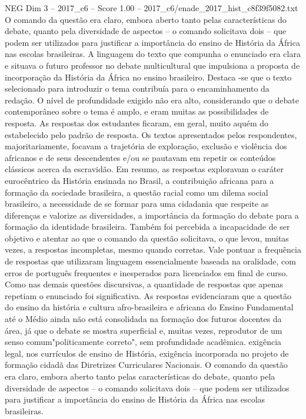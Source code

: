 \begin{textsample}{NEG Dim 3 – 2017\_c6 – Score 1.00 – 2017\_c6/enade\_2017\_hist\_c8f39f5082.txt}
O comando da questão era claro, embora aberto tanto pelas características do debate, quanto pela diversidade de aspectos – o comando solicitava dois – que podem ser utilizados para justificar a importância do ensino de História da África nas escolas brasileiras.
A linguagem do texto que compunha o enunciado era clara e situava o futuro professor no debate multicultural que impulsiona a proposta de incorporação da História da África no ensino brasileiro.
Destaca -se que o texto selecionado para introduzir o tema contribuía para o encaminhamento da redação.
O nível de profundidade exigido não era alto, considerando que o debate contemporâneo sobre o tema é amplo, e eram muitas as possibilidades de resposta.
As respostas dos estudantes ficaram, em geral, muito aquém do estabelecido pelo padrão de resposta.
Os textos apresentados pelos respondentes, majoritariamente, focavam a trajetória de exploração, exclusão e violência dos africanos e de seus descendentes e/ou se pautavam em repetir os conteúdos clássicos acerca da escravidão.
Em resumo, as respostas exploravam o caráter eurocêntrico da História ensinada no Brasil, a contribuição africana para a formação da sociedade brasileira, a questão racial como um dilema social brasileiro, a necessidade de se formar para uma cidadania que respeite as diferenças e valorize as diversidades, a importância da formação do debate para a formação da identidade brasileira.
Também foi percebida a incapacidade de ser objetivo e atentar ao que o comando da questão solicitava, o que levou, muitas vezes, a respostas incompletas, mesmo quando corretas.
Vale pontuar a frequência de respostas que utilizaram linguagem essencialmente baseada na oralidade, com erros de português frequentes e inesperados para licenciados em final de curso.
Como nas demais questões discursivas, a quantidade de respostas que apenas repetiam o enunciado foi significativa.
As respostas evidenciaram que a questão do ensino da história e cultura afro-brasileira e africana do Ensino Fundamental até o Médio ainda não está consolidada na formação dos futuros docentes da área, já que o debate se mostra superficial e, muitas vezes, reprodutor de um senso comum"politicamente correto", sem profundidade acadêmica. exigência legal, nos currículos de ensino de História, exigência incorporada no projeto de formação cidadã das Diretrizes Curriculares Nacionais.
O comando da questão era claro, embora aberto tanto pelas características do debate, quanto pela diversidade de aspectos – o comando solicitava dois – que podem ser utilizados para justificar a importância do ensino de História da África nas escolas brasileiras.

\end{textsample}
